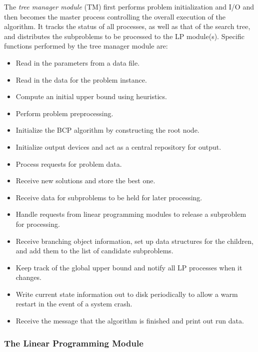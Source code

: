 The {\em tree manager module} (TM) first performs problem initialization
and I/O and then becomes the master process controlling the overall
execution of the algorithm. It tracks the status of all processes, as
well as that of the search tree, and distributes the subproblems to be
processed to the LP module(s). Specific functions performed by the
tree manager module are:
\begin{itemize}
\item Read in the parameters from a data file.
\item Read in the data for the problem instance.
\item Compute an initial upper bound using heuristics.
\item Perform problem preprocessing.
\item Initialize the BCP algorithm by constructing the root node.
\item Initialize output devices and act as a central repository for output.
\item Process requests for problem data.
\item Receive new solutions and store the best one.
\item Receive data for subproblems to be held for later processing.
\item Handle requests from linear programming modules to
  release a subproblem for processing.
\item Receive branching object information, set up data structures
  for the children, and add them to the list of candidate subproblems.
\item Keep track of the global upper bound and notify all LP
  processes when it changes.
\item Write current state information out to disk periodically
  to allow a warm restart in the event of a system crash.
\item Receive the message that the algorithm is finished and
  print out run data.
\end{itemize}

\subsubsection{The Linear Programming Module}

